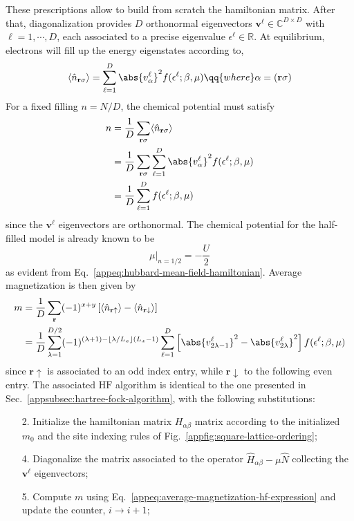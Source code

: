 These prescriptions allow to build from scratch the hamiltonian matrix. After that, diagonalization provides $D$ orthonormal eigenvectors $\mathbf{v}^\ell \in \mathbb{C}^{D \times D}$ with $\ell=1,\cdots,D$, each associated to a precise eigenvalue $\epsilon^\ell \in \mathbb{R}$. At equilibrium, electrons will fill up the energy eigenstates according to,
\[
	\langle
		\hat n_{\mathbf{r}\sigma}
	\rangle = \sum_{\ell=1}^D \abs{v_\alpha^\ell}^2 f(\epsilon^\ell;\beta,\mu)
	\qq{where}
	\alpha = (\mathbf{r}\sigma)
\]
For a fixed filling $n = N/D$, the chemical potential must satisfy
\[
\begin{aligned}
	n &= \frac{1}{D} \sum_{\mathbf{r}\sigma} \langle
		\hat n_{\mathbf{r}\sigma}
	\rangle \\
	&= \frac{1}{D} \sum_{\mathbf{r}\sigma} \sum_{\ell=1}^D \abs{v_\alpha^\ell}^2 f(\epsilon^\ell;\beta,\mu) \\
	&= \frac{1}{D} \sum_{\ell=1}^D f(\epsilon^\ell;\beta,\mu)
\end{aligned} 
\]
since the $\mathbf{v}^\ell$ eigenvectors are orthonormal. The chemical potential for the half-filled model is already known to be
\[
	\mu \big|_{n=1/2} = -\frac{U}{2}
\]
as evident from Eq.~\eqref{appeq:hubbard-mean-field-hamiltonian}. Average magnetization is then given by
\begin{align}
	m &= \frac{1}{D} \sum_{\mathbf{r}} (-1)^{x+y} \left[
		\langle
			\hat n_{\mathbf{r}\uparrow}
			\rangle - \langle
			\hat n_{\mathbf{r}\downarrow}
		\rangle
	\right] \nonumber \\
	&= \frac{1}{D} \sum_{\lambda=1}^{D/2} (-1)^{
		(\lambda+1) - \left\lfloor
			\lambda / L_x
		\right\rfloor (L_x-1)
	} \sum_{\ell=1}^D \left[
		\abs{v_{2\lambda-1}^\ell}^2 - \abs{v_{2\lambda}^\ell}^2
	\right] f(\epsilon^\ell;\beta,\mu) \label{appeq:average-magnetization-hf-expression}
\end{align}
since $\mathbf{r}\uparrow$ is associated to an odd index entry, while $\mathbf{r}\downarrow$ to the following even entry. The associated $\mathrm{HF}$ algorithm is identical to the one presented in Sec.~\ref{appsubsec:hartree-fock-algorithm}, with the following substitutions:
\begin{enumerate}
	\item[2.] Initialize the hamiltonian matrix $H_{\alpha\beta}$ matrix according to the initialized $m_0$ and the site indexing rules of Fig.~\ref{appfig:square-lattice-ordering};
	\item[4.] Diagonalize the matrix associated to the operator $\hat H_{\alpha\beta}-\mu \hat N$ collecting the $\mathbf{v}^\ell$ eigenvectors;
	\item[5.] Compute $m$ using Eq.~\eqref{appeq:average-magnetization-hf-expression} and update the counter, $i \to i+1$;
\end{enumerate}